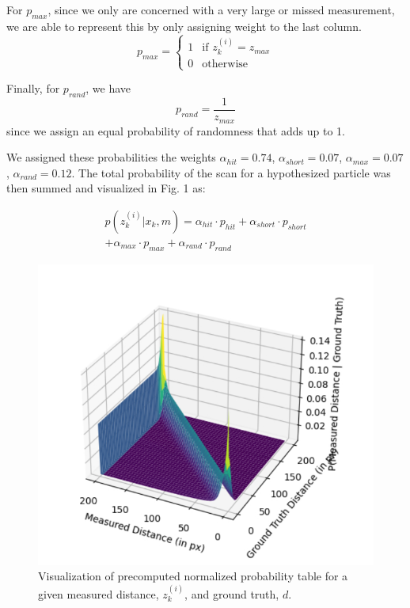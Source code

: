\documentclass[11pt,twocolumn]{article}
\begin{document}
For $p_{max}$, since we only are concerned with a very large or missed measurement, we are able to represent this by only assigning weight to the last column.
\begin{equation}
p_{max} =
    \begin{cases} 
          1 & \text{if } z^{(i)}_k = z_{max} \\
          0 & \text{otherwise}
       \end{cases}
\end{equation}

Finally, for $p_{rand}$, we have
\begin{equation}
p_{rand} = \frac{1}{z_{max}} \label{eqn:equation1}
\end{equation}
since we assign an equal probability of randomness that adds up to 1.

We assigned these probabilities the weights $\alpha_{hit} = 0.74$, $\alpha_{short} = 0.07$, $\alpha_{max} = 0.07$, $\alpha_{rand} = 0.12$. The total probability of the scan for a hypothesized particle was then summed and visualized in Fig. 1 as:

\begin{multline}
    p(z^{(i)}_k|x_k, m) = \alpha_{hit}\cdot p_{hit} + \alpha_{short}\cdot p_{short} \\ + \alpha_{max}\cdot p_{max}  + \alpha_{rand}\cdot p_{rand} 
\end{multline}

\begin{figure}[h]
    \centering
\includegraphics[scale=0.5]{figures/sensor_model_plot.png}
    \caption{Visualization of precomputed normalized probability table for a given measured distance, $z^{(i)}_k$, and ground truth, $d$.}
    \label{fig:1}
\end{figure}
\end{document}
